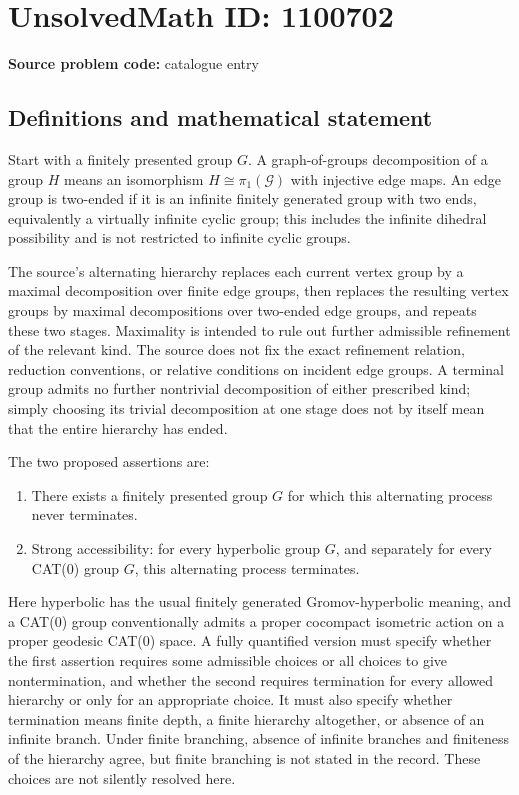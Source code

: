 \documentclass[11pt]{article}
\begin{document}
\section*{UnsolvedMath ID: 1100702}
\textbf{Source problem code:} catalogue entry
\subsection{Definitions and mathematical statement}
Start with a finitely presented group $G$. A graph-of-groups decomposition of a group $H$ means an isomorphism $H\cong\pi_1(\mathcal G)$ with injective edge maps. An edge group is two-ended if it is an infinite finitely generated group with two ends, equivalently a virtually infinite cyclic group; this includes the infinite dihedral possibility and is not restricted to infinite cyclic groups.

The source's alternating hierarchy replaces each current vertex group by a maximal decomposition over finite edge groups, then replaces the resulting vertex groups by maximal decompositions over two-ended edge groups, and repeats these two stages. Maximality is intended to rule out further admissible refinement of the relevant kind. The source does not fix the exact refinement relation, reduction conventions, or relative conditions on incident edge groups. A terminal group admits no further nontrivial decomposition of either prescribed kind; simply choosing its trivial decomposition at one stage does not by itself mean that the entire hierarchy has ended.

The two proposed assertions are:
\begin{enumerate}
\item There exists a finitely presented group $G$ for which this alternating process never terminates.
\item Strong accessibility: for every hyperbolic group $G$, and separately for every CAT(0) group $G$, this alternating process terminates.
\end{enumerate}
Here hyperbolic has the usual finitely generated Gromov-hyperbolic meaning, and a CAT(0) group conventionally admits a proper cocompact isometric action on a proper geodesic CAT(0) space. A fully quantified version must specify whether the first assertion requires some admissible choices or all choices to give nontermination, and whether the second requires termination for every allowed hierarchy or only for an appropriate choice. It must also specify whether termination means finite depth, a finite hierarchy altogether, or absence of an infinite branch. Under finite branching, absence of infinite branches and finiteness of the hierarchy agree, but finite branching is not stated in the record. These choices are not silently resolved here.
\end{document}
